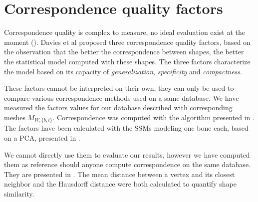 

\section{Correspondence quality factors}
\label{appendix:Correspondence_quality_factors}

Correspondence quality is complex to measure, no ideal evaluation exist at the moment (). Davies et al \cite{davies_2001_minimum} proposed three correspondence quality factors, based on the observation that the better the correspondence between shapes, the better the statistical model computed with these shapes. The three factors characterize the model based on its capacity of \textit{generalization}, \textit{specificity} and \textit{compactness}. 

These factors cannot be interpreted on their own, they can only be used to compare various correspondence methods used on a same database. We have measured the factors values for our database described with corresponding meshes $M_{W,\{b,i\}}$. Correspondence was computed with the algorithm presented in . The factors have been calculated with the SSMs modeling one bone each, based on a PCA, presented in .

We cannot directly use them to evaluate our results, however we have computed them as reference should anyone compute correspondence on the same database. They are presented in . The mean distance between a vertex and its closest neighbor and the Hausdorff distance were both calculated to quantify shape similarity. 



